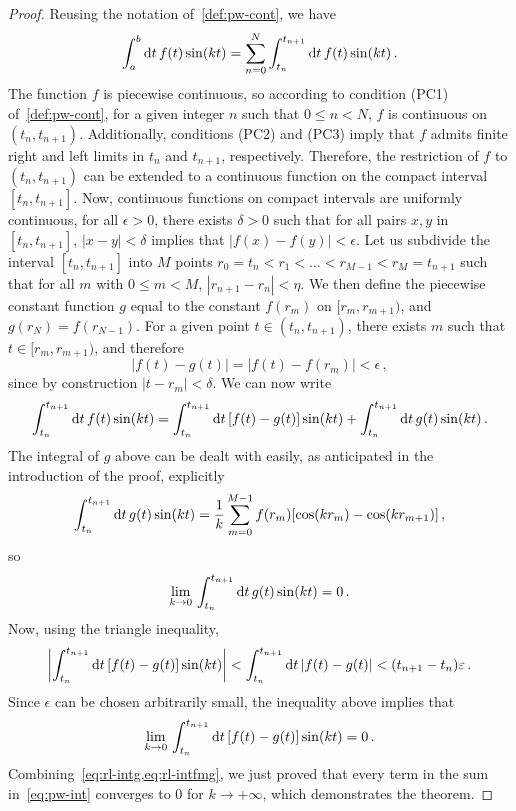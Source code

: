 \begin{proof}
  Reusing the notation of~\cref{def:pw-cont}, we have
  \begin{equation}
    \int_a^b\mathrm{d} t\, f(t)\sin(kt)
    =\sum_{n=0}^{N}\int_{t_n}^{t_{n+1}}\mathrm{d} t\, f(t)\sin(kt)\,.
    \label{eq:pw-int}
  \end{equation}
  The function $f$ is piecewise continuous, so according to condition (PC1)
  of~\cref{def:pw-cont}, for a given integer $n$ such that $0\leq n<N$, $f$ is continuous
  on $(t_n,t_{n+1})$. Additionally, conditions (PC2) and (PC3) imply that $f$ admits
  finite right and left limits in $t_n$ and $t_{n+1}$, respectively. Therefore, the
  restriction of $f$ to $(t_n,t_{n+1})$ can be extended to a continuous function on the
  compact interval $[t_n,t_{n+1}]$. Now, continuous functions on compact intervals are
  uniformly continuous, \ie for all $\epsilon>0$, there exists $\delta>0$ such that for
  all pairs $x,y$ in $[t_n,t_{n+1}]$, $|x-y|<\delta$ implies that $|f(x)-f(y)|<\epsilon$.
  Let us subdivide the interval $[t_n,t_{n+1}]$ into $M$ points
  $r_0=t_n<r_1<\dots<r_{M-1}<r_M=t_{n+1}$ such that for all $m$ with $0\leq m<M$,
  $|r_{n+1}-r_n|<\eta$. We then define the piecewise constant function $g$ equal to the
  constant $f(r_m)$ on $[r_m,r_{m+1})$, and $g(r_N)=f(r_{N-1})$. For a given point
  $t\in(t_n,t_{n+1})$, there exists $m$ such that $t\in[r_m,r_{m+1})$, and therefore
  \begin{equation}
    |f(t)-g(t)|=|f(t)-f(r_m)|<\epsilon\,,
  \end{equation}
  since by construction $|t-r_m|<\delta$. We can now write
  \begin{equation}
    \int_{t_n}^{t_{n+1}}\mathrm{d} t\, f(t)\sin(kt)
    =\int_{t_n}^{t_{n+1}}\mathrm{d} t\, [f(t)-g(t)]\sin(kt)
    +\int_{t_n}^{t_{n+1}}\mathrm{d} t\,g(t)\sin(kt)\,.
  \end{equation}
  The integral of $g$ above can be dealt with easily, as anticipated in the introduction
  of the proof, explicitly
  \begin{equation}
    \int_{t_n}^{t_{n+1}}\mathrm{d} t\,g(t)\sin(kt)
    =\frac{1}{k}\sum_{m=0}^{M-1}f(r_m)[\cos(kr_m)-\cos(kr_{m+1})]\,,
  \end{equation}
  so
  \begin{equation}
    \lim_{k\to0}\,\int_{t_n}^{t_{n+1}}\mathrm{d} t\,g(t)\sin(kt)=0\,.
    \label{eq:rl-intg}
  \end{equation}
  Now, using the triangle inequality,
  \begin{equation}
    \left|\int_{t_n}^{t_{n+1}}\mathrm{d} t\, [f(t)-g(t)]\sin(kt)\right|<
    \int_{t_n}^{t_{n+1}}\mathrm{d} t\, |f(t)-g(t)|<(t_{n+1}-t_n)\varepsilon\,.
  \end{equation}
  Since $\epsilon$ can be chosen arbitrarily small, the inequality above implies that
  \begin{equation}
    \lim_{k\to0}\,\int_{t_n}^{t_{n+1}}\mathrm{d} t\, [f(t)-g(t)]\sin(kt)=0\,.
    \label{eq:rl-intfmg}
  \end{equation}
  Combining~\cref{eq:rl-intg,eq:rl-intfmg}, we just proved that every term in the sum
  in~\cref{eq:pw-int} converges to $0$ for $k\to+\infty$, which demonstrates the theorem.
\end{proof}
